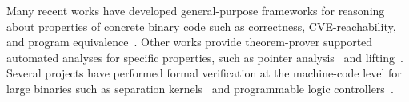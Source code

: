 {Many recent works have developed general-purpose frameworks for reasoning about properties of concrete binary code such as correctness, CVE-reachability, and program equivalence~\cite{islaris,isabil,myreen_hoare_rmmc,relational_hoare_logic_rmmc,trabin,forward_symb_reasoning_vmcai26}.
Other works provide theorem-prover supported automated analyses for specific properties, such as pointer analysis~\cite{verified_pointers} and lifting~\cite{formally_verified_lifting}.
Several projects have performed formal verification at the machine-code level for large binaries such as separation kernels~\cite{sep_kernel} and programmable logic controllers~\cite{zhang2024binary}.

}

